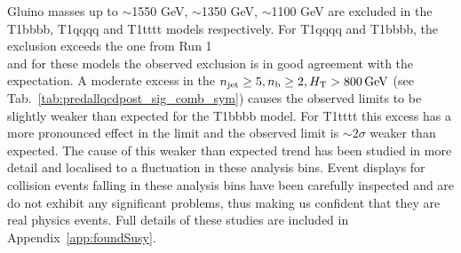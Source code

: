 Gluino masses up to $\sim$1550 GeV, $\sim$1350 GeV, $\sim$1100 GeV are excluded in the T1bbbb, 
T1qqqq and T1tttt models respectively. 
For T1qqqq and T1bbbb, the exclusion exceeds the one from Run 1 \\
and for these models the observed exclusion is in good agreement with the expectation. 
A moderate excess in the $\njet\geq5, \nb\geq2, \scalht > 800 \, \mathrm{GeV}$ (see Tab.~\ref{tab:predallqcdpost_sig_comb_sym})
causes the observed limits to be slightly weaker than expected for the T1bbbb model. 
For T1tttt this excess has a more pronounced effect in the limit and the observed limit is $\sim 2\sigma$ 
weaker than expected. The cause of this weaker than expected trend has been studied in more detail
and localised to a fluctuation in these analysis bins. Event displays for collision events 
falling in these analysis bins have been carefully inspected and are do not exhibit any 
significant problems, thus making us confident that they are real physics events. Full details
of these studies are included in Appendix~\ref{app:foundSusy}.

